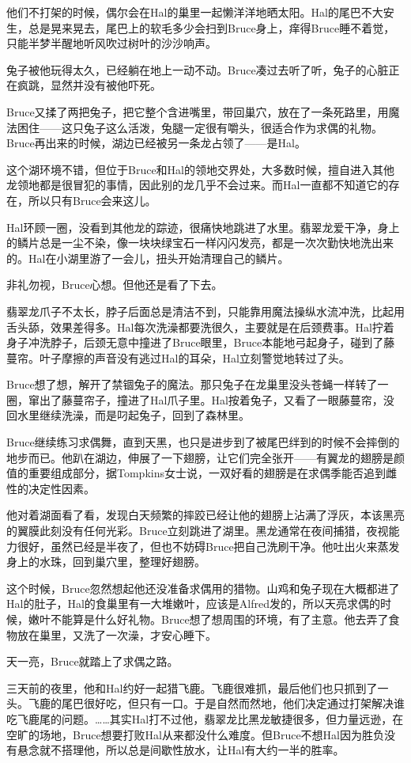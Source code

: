 \documentclass[../main.tex]{subfiles}
\begin{document}
他们不打架的时候，偶尔会在Hal的巢里一起懒洋洋地晒太阳。Hal的尾巴不大安生，总是晃来晃去，尾巴上的软毛多少会扫到Bruce身上，痒得Bruce睡不着觉，只能半梦半醒地听风吹过树叶的沙沙响声。

兔子被他玩得太久，已经躺在地上一动不动。Bruce凑过去听了听，兔子的心脏正在疯跳，显然并没有被他吓死。

Bruce又揉了两把兔子，把它整个含进嘴里，带回巢穴，放在了一条死路里，用魔法困住------这只兔子这么活泼，兔腿一定很有嚼头，很适合作为求偶的礼物。Bruce再出来的时候，湖边已经被另一条龙占领了------是Hal。

这个湖环境不错，但位于Bruce和Hal的领地交界处，大多数时候，擅自进入其他龙领地都是很冒犯的事情，因此别的龙几乎不会过来。而Hal一直都不知道它的存在，所以只有Bruce会来这儿。

Hal环顾一圈，没看到其他龙的踪迹，很痛快地跳进了水里。翡翠龙爱干净，身上的鳞片总是一尘不染，像一块块绿宝石一样闪闪发亮，都是一次次勤快地洗出来的。Hal在小湖里游了一会儿，扭头开始清理自己的鳞片。

非礼勿视，Bruce心想。但他还是看了下去。

翡翠龙爪子不太长，脖子后面总是清洁不到，只能靠用魔法操纵水流冲洗，比起用舌头舔，效果差得多。Hal每次洗澡都要洗很久，主要就是在后颈费事。Hal拧着身子冲洗脖子，后颈无意中撞进了Bruce眼里，Bruce本能地弓起身子，碰到了藤蔓帘。叶子摩擦的声音没有逃过Hal的耳朵，Hal立刻警觉地转过了头。

Bruce想了想，解开了禁锢兔子的魔法。那只兔子在龙巢里没头苍蝇一样转了一圈，窜出了藤蔓帘子，撞进了Hal爪子里。Hal按着兔子，又看了一眼藤蔓帘，没回水里继续洗澡，而是叼起兔子，回到了森林里。

Bruce继续练习求偶舞，直到天黑，也只是进步到了被尾巴绊到的时候不会摔倒的地步而已。他趴在湖边，伸展了一下翅膀，让它们完全张开------有翼龙的翅膀是颜值的重要组成部分，据Tompkins女士说，一双好看的翅膀是在求偶季能否追到雌性的决定性因素。

他对着湖面看了看，发现白天频繁的摔跤已经让他的翅膀上沾满了浮灰，本该黑亮的翼膜此刻没有任何光彩。Bruce立刻跳进了湖里。黑龙通常在夜间捕猎，夜视能力很好，虽然已经是半夜了，但也不妨碍Bruce把自己洗刷干净。他吐出火来蒸发身上的水珠，回到巢穴里，整理好翅膀。

这个时候，Bruce忽然想起他还没准备求偶用的猎物。山鸡和兔子现在大概都进了Hal的肚子，Hal的食巢里有一大堆嫩叶，应该是Alfred发的，所以天亮求偶的时候，嫩叶不能算是什么好礼物。Bruce想了想周围的环境，有了主意。他去弄了食物放在巢里，又洗了一次澡，才安心睡下。

天一亮，Bruce就踏上了求偶之路。

三天前的夜里，他和Hal约好一起猎飞鹿。飞鹿很难抓，最后他们也只抓到了一头。飞鹿的尾巴很好吃，但只有一口。于是自然而然地，他们决定通过打架解决谁吃飞鹿尾的问题。\ldots\ldots 其实Hal打不过他，翡翠龙比黑龙敏捷很多，但力量远逊，在空旷的场地，Bruce想要打败Hal从来都没什么难度。但Bruce不想Hal因为胜负没有悬念就不搭理他，所以总是间歇性放水，让Hal有大约一半的胜率。
\end{document}
